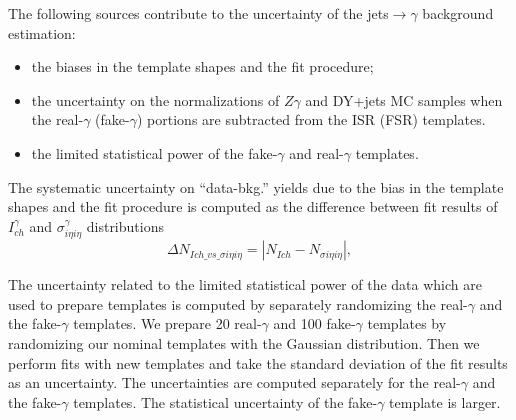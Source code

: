 The following sources contribute to the uncertainty of  the jets$\rightarrow\gamma$ background estimation:
\begin{itemize}
  \item the biases in the template shapes and the fit procedure;
  \item the uncertainty on the normalizations of $Z\gamma$ and DY+jets MC samples when the real-$\gamma$ (fake-$\gamma$) portions are subtracted from the ISR (FSR) templates. 
  \item the limited statistical power of the fake-$\gamma$ and real-$\gamma$ templates.
\end{itemize}

The systematic uncertainty on ``data-bkg.'' yields due to the bias in the template shapes and the fit procedure is computed as the difference between fit results of $I_{ch}^\gamma$ and $\sigma_{i\eta i\eta}^\gamma$ distributions
\begin{equation}
  \Delta N_{Ich\_vs\_\sigma i\eta i\eta} = |N_{Ich}-N_{\sigma i\eta i\eta}|,
\end{equation}

The uncertainty related to the limited statistical power of the data which are used to prepare templates is computed by separately randomizing the real-$\gamma$ and the fake-$\gamma$ templates. We prepare 20 real-$\gamma$ and 100 fake-$\gamma$ templates by randomizing our nominal templates with the Gaussian distribution. Then we perform fits with new templates and take the standard deviation of the fit results as an uncertainty. The uncertainties are computed separately for the real-$\gamma$ and the fake-$\gamma$ templates. The statistical uncertainty of the fake-$\gamma$ template is larger.

